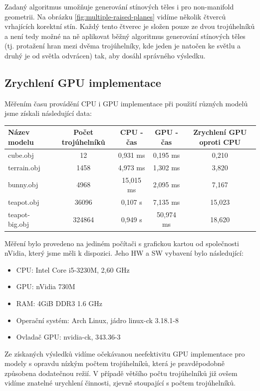 \documentclass[11pt,a4paper]{article}
\begin{document}
Zadaný algoritmus umožňuje generování stínových těles i pro non-manifold geometrii. Na obrázku \ref{fig:multiple-raised-planes} vidíme několik čtverců vrhajících korektní stín. Každý tento čtverec je složen pouze ze dvou trojúhelníků a není tedy možné na ně aplikovat běžný algoritmus generování stínových těles (tj. protažení hran mezi dvěma trojúhelníky, kde jeden je natočen ke světlu a druhý je od světla odvrácen) tak, aby dosáhl správného výsledku.

\subsection{Zrychlení GPU implementace}

Měřením času provádění CPU i GPU implementace při použití různých modelů jsme získali následující data:

\begin{tabular}{l|c|c|c|c}
	Název modelu   & Počet trojúhelníků  & CPU - čas  & GPU - čas & Zrychlení GPU oproti CPU \\
	\hline
	cube.obj       & 12      & 0,931 ms   & 0,195 ms  & 0,210 \\
	terrain.obj    & 1458    & 4,973 ms   & 1,302 ms  & 3,820 \\ 
	bunny.obj      & 4968    & 15,015 ms  & 2,095 ms  & 7,167 \\
	teapot.obj     & 36096   & 0,107 s    & 7,135 ms  & 15,023 \\
	teapot-big.obj & 324864  & 0,949 s    & 50,974 ms & 18,620 \\
\end{tabular}

Měření bylo provedeno na jediném počítači s grafickou kartou od společnosti nVidia, který jsme měli k dispozici. Jeho HW a SW vybavení bylo následující:
\begin{itemize}
	\item CPU: Intel Core i5-3230M, 2,60 GHz
	\item GPU: nVidia 730M
	\item RAM: 4GiB DDR3 1.6 GHz
	\item Operační systém: Arch Linux, jádro linux-ck 3.18.1-8
	\item Ovladač GPU: nvidia-ck, 343.36-3
\end{itemize}

Ze získaných výsledků vidíme očekávanou neefektivitu GPU implementace pro modely s opravdu nízkým počtem trojúhelníků, která je pravděpodobně způsobena dodatečnou režií. V případě většího počtu trojúhelníků již ovšem vidíme znatelné urychlení činnosti, zjevně stoupající s počtem trojúhelníků.
\end{document}
